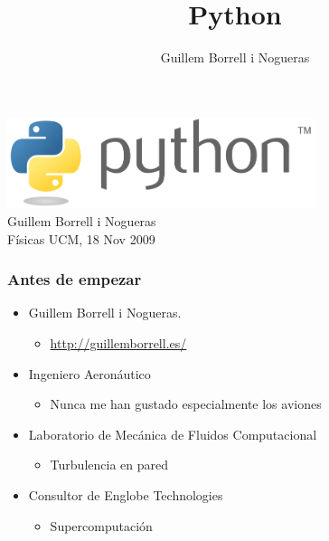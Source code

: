 \documentclass[12pt]{beamer}
\title{Python}
\author{Guillem Borrell i Nogueras}
\begin{document}

\begin{frame}
\begin{center}
 \includegraphics[width=9cm]{files/python-logo-generic.pdf}\\
\vspace{1cm}
Guillem Borrell i Nogueras\\

Físicas UCM, 18 Nov 2009
\end{center}

\end{frame}

\begin{frame}
  \frametitle{Antes de empezar}
  \begin{itemize}
  \item Guillem Borrell i Nogueras.
    \begin{itemize}
    \item  \url{http://guillemborrell.es/}
    \end{itemize}
  \item Ingeniero Aeronáutico
    \begin{itemize}
    \item Nunca me han gustado especialmente los aviones
    \end{itemize}
  \item Laboratorio de Mecánica de Fluidos Computacional
    \begin{itemize}
    \item Turbulencia en pared
    \end{itemize}
  \item Consultor de Englobe Technologies
    \begin{itemize}
    \item Supercomputación
    \end{itemize}
  \end{itemize}
\end{frame}
\end{document}

